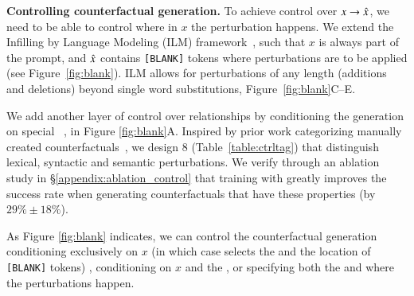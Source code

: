 \textbf{Controlling counterfactual generation.}
To achieve control over $x \rightarrow \hat{x}$, we need to be able to control where in $x$ the perturbation happens. 
We extend the Infilling by Language Modeling (ILM) framework~\cite{donahue2020enabling}, such that $x$ is always part of the prompt, and $\hat{x}$ contains \texttt{[BLANK]} tokens where perturbations are to be applied (see Figure~\ref{fig:blank}). 
ILM allows for perturbations of any length (additions and deletions) beyond single word substitutions, \eg Figure~\ref{fig:blank}C--E.

We add another layer of control over relationships by conditioning the generation on special \tagstrs~\cite{raffel2019exploring, Dathathri2020Plug}, \eg {} in Figure \ref{fig:blank}A.
Inspired by prior work categorizing manually created counterfactuals~\cite{kaushik2019learning, gardner2020contrast}, we design 8 \tagstrshorts (Table~\ref{table:ctrltag}) that distinguish lexical, syntactic and semantic perturbations. 
We verify through an ablation study in \S\ref{appendix:ablation_control} that training \sysname with \tagstrs greatly improves the success rate when generating counterfactuals that have these properties (by $29\% \pm 18\%$). 

As Figure \ref{fig:blank} indicates, we can control the counterfactual generation conditioning exclusively on $x$ (in which case \sysname selects the \tagstr and the location of \texttt{[BLANK]} tokens) , conditioning on $x$ and the \tagstr, or specifying both the \tagstrshort and where the perturbations happen.




